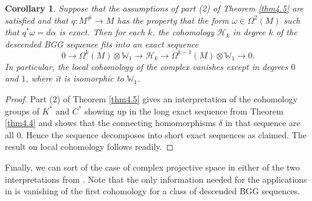 \documentclass[12pt,a4paper]{amsart}
\def\Bbb{\mathbb}
\def\Cal{\mathcal}
\newcommand{\al}{\alpha}
\newcommand{\om}{\omega}
\newcommand{\Om}{\Omega}
\newcounter{theorem}
\numberwithin{theorem}{section}
\newtheorem{cor}[theorem]{Corollary}
\theoremstyle{definition}
\theoremstyle{remark}
\begin{document}
\begin{cor}\label{cor4.6}
  Suppose that the assumptions of part (2) of Theorem \ref{thm4.5} are
  satisfied and that $q:M^\#\to M$ has the property that the form
  $\om\in\Om^2(M)$ such that $q^*\om=d\al$ is exact. Then for each
  $k$, the cohomology $\Cal H_k$ in degree $k$ of the descended BGG
  sequence fits into an exact sequence
$$
0\to \Om^k(M)\otimes\Bbb W_1\to \Cal H_k\to
\Om^{k-1}(M)\otimes\Bbb W_1\to 0. 
$$
In particular, the local cohomology of the complex vanishes except in
degrees $0$ and $1$, where it is isomorphic to $\Bbb W_1$.
\end{cor}
\begin{proof}
  Part (2) of Theorem \ref{thm4.5} gives an interpretation of the
  cohomology groups of $K^*$ and $C^*$ showing up in the long exact
  sequence from Theorem \ref{thm4.4} and shows that the connecting
  homomorphisms $\delta$ in that sequence are all $0$. Hence the
  sequence decomposes into short exact sequences as claimed. The
  result on local cohomology follows readily.
\end{proof}

Finally, we can sort of the case of complex projective space in either
of the two interpretations from \cite{PCS2}. Note that the only
information needed for the applications in \cite{E-G} is vanishing of
the first cohomology for a class of descended BGG sequences. 
\end{document}
